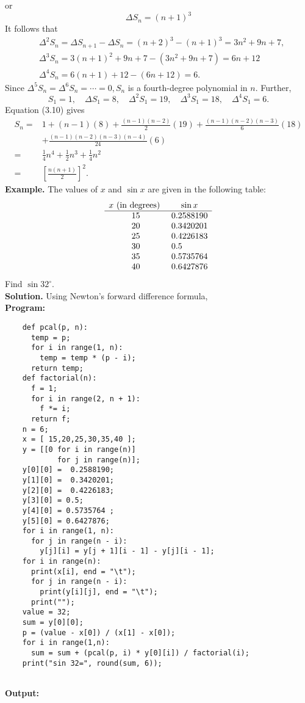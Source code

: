 \documentclass[12pt,a4paper,oneside]{book}
\begin{document}
or
$$
\Delta S_n=(n+1)^3
$$
It follows that
$$
\begin{aligned}
	& \Delta^2 S_n=\Delta S_{n+1}-\Delta S_n=(n+2)^3-(n+1)^3=3 n^2+9 n+7, \\
	& \Delta^3 S_n=3(n+1)^2+9 n+7-\left(3 n^2+9 n+7\right)=6 n+12 \\
	& \Delta^4 S_n=6(n+1)+12-(6 n+12)=6 .
\end{aligned}
$$
Since $\Delta^5 S_n=\Delta^6 S_n=\cdots=0, S_n$ is a fourth-degree polynomial in $n$.
Further,
$$
S_1=1, \quad \Delta S_1=8, \quad \Delta^2 S_1=19, \quad \Delta^3 S_1=18, \quad \Delta^4 S_1=6 .
$$
Equation (3.10) gives
$$
\begin{aligned}
	S_n= & 1+(n-1)(8)+\frac{(n-1)(n-2)}{2}(19)+\frac{(n-1)(n-2)(n-3)}{6}(18) \\
	& +\frac{(n-1)(n-2)(n-3)(n-4)}{24}(6) \\[0.3cm]
	= & \frac{1}{4} n^4+\frac{1}{2} n^3+\frac{1}{4} n^2 \\[0.3cm]
	= & {\left[\frac{n(n+1)}{2}\right]^2 . }
\end{aligned}
$$
\noindent\textbf{Example.}
The values of $x$ and $\sin x$ are given in the following table:
$$
\begin{array}{cl}
	x \text { (in degrees) } & \multicolumn{1}{c}{\sin x} \\
	\hline 15 & 0.2588190 \\
	20 & 0.3420201 \\
	25 & 0.4226183 \\
	30 & 0.5 \\
	35 & 0.5735764 \\
	40 & 0.6427876
\end{array}
$$
Find $\sin 32^\circ$.\\
\textbf{Solution.}
Using Newton's forward difference formula,\\
\textbf{Program:}
\begin{lstlisting}
	def pcal(p, n):
	  temp = p;
	  for i in range(1, n):
	    temp = temp * (p - i);
	  return temp;
	def factorial(n):
	  f = 1;
	  for i in range(2, n + 1):
	    f *= i;
	  return f;
	n = 6;
	x = [ 15,20,25,30,35,40 ];
	y = [[0 for i in range(n)]
	        for j in range(n)];
	y[0][0] =  0.2588190;
	y[1][0] =  0.3420201;
	y[2][0] =  0.4226183;
	y[3][0] = 0.5;
	y[4][0] = 0.5735764 ;
	y[5][0] = 0.6427876;
	for i in range(1, n):
	  for j in range(n - i):
	    y[j][i] = y[j + 1][i - 1] - y[j][i - 1];
	for i in range(n):
	  print(x[i], end = "\t");
	  for j in range(n - i):
	    print(y[i][j], end = "\t");
	  print("");
	value = 32;
	sum = y[0][0];
	p = (value - x[0]) / (x[1] - x[0]);
	for i in range(1,n):
	  sum = sum + (pcal(p, i) * y[0][i]) / factorial(i);
	print("sin 32=", round(sum, 6));
	
\end{lstlisting}
\textbf{Output:}
\end{document}

